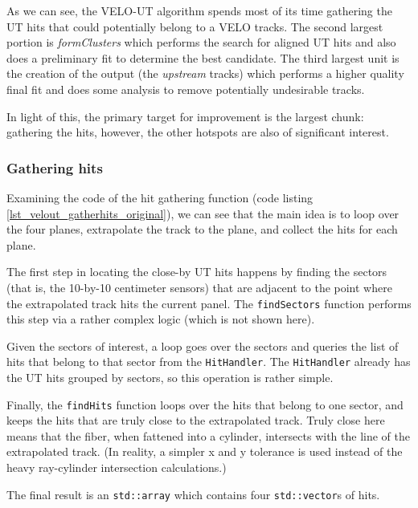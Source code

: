 \documentclass[12pt]{article}
\newcommand{\code}[1]{\texttt{#1}}
\begin{document}
As we can see, the VELO-UT algorithm spends most of its time gathering the UT hits that could potentially belong to a VELO tracks. The second largest portion is \textit{formClusters} which performs the search for aligned UT hits and also does a preliminary fit to determine the best candidate. The third largest unit is the creation of the output (the \textit{upstream} tracks) which performs a higher quality final fit and does some analysis to remove potentially undesirable tracks.

In light of this, the primary target for improvement is the largest chunk: gathering the hits, however, the other hotspots are also of significant interest.


\subsubsection{Gathering hits}

Examining the code of the hit gathering function (code listing \ref{lst_velout_gatherhits_original}), we can see that the main idea is to loop over the four planes, extrapolate the track to the plane, and collect the hits for each plane.

The first step in locating the close-by UT hits happens by finding the sectors (that is, the 10-by-10 centimeter sensors) that are adjacent to the point where the extrapolated track hits the current panel. The \code{findSectors} function performs this step via a rather complex logic (which is not shown here).

Given the sectors of interest, a loop goes over the sectors and queries the list of hits that belong to that sector from the \code{HitHandler}. The \code{HitHandler} already has the UT hits grouped by sectors, so this operation is rather simple.

Finally, the \code{findHits} function loops over the hits that belong to one sector, and keeps the hits that are truly close to the extrapolated track. Truly close here means that the fiber, when fattened into a cylinder, intersects with the line of the extrapolated track. (In reality, a simpler x and y tolerance is used instead of the heavy ray-cylinder intersection calculations.)

The final result is an \code{std::array} which contains four \code{std::vector}s of hits.

\vspace{1pc}
\end{document}
